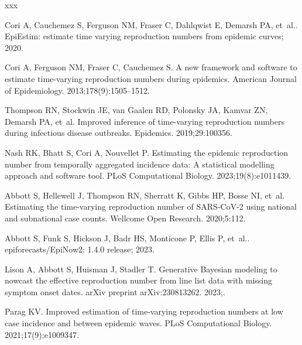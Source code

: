 \documentclass[10pt,letterpaper]{article}
\begin{document}
xxx
\nolinenumbers

%
%
% 
\begin{thebibliography}{10}

  Cori A, Cauchemez S, Ferguson NM, Fraser C, Dahlqwist E, Demarsh PA, et~al..
    {EpiEstim}: estimate time varying reproduction numbers from epidemic curves;
    2020.
  
  Cori A, Ferguson NM, Fraser C, Cauchemez S.
  \newblock A new framework and software to estimate time-varying reproduction
    numbers during epidemics.
  \newblock American Journal of Epidemiology. 2013;178(9):1505--1512.
  
  Thompson RN, Stockwin JE, van Gaalen RD, Polonsky JA, Kamvar ZN, Demarsh PA,
    et~al.
  \newblock Improved inference of time-varying reproduction numbers during
    infectious disease outbreaks.
  \newblock Epidemics. 2019;29:100356.
  
  Nash RK, Bhatt S, Cori A, Nouvellet P.
  \newblock Estimating the epidemic reproduction number from temporally
    aggregated incidence data: A statistical modelling approach and software
    tool.
  \newblock PLoS Computational Biology. 2023;19(8):e1011439.
  
  Abbott S, Hellewell J, Thompson RN, Sherratt K, Gibbs HP, Bosse NI, et~al.
  \newblock Estimating the time-varying reproduction number of {SARS-CoV-2} using
    national and subnational case counts.
  \newblock Wellcome Open Research. 2020;5:112.
  
  Abbott S, Funk S, Hickson J, Badr HS, Monticone P, Ellis P, et~al..
    epiforecasts/{EpiNow2}: 1.4.0 release; 2023.
  
  Lison A, Abbott S, Huisman J, Stadler T.
  \newblock Generative {B}ayesian modeling to nowcast the effective reproduction
    number from line list data with missing symptom onset dates.
  \newblock arXiv preprint arXiv:230813262. 2023;.
  
  Parag KV.
  \newblock Improved estimation of time-varying reproduction numbers at low case
    incidence and between epidemic waves.
  \newblock PLoS Computational Biology. 2021;17(9):e1009347.
  

\end{thebibliography}
\end{document}
